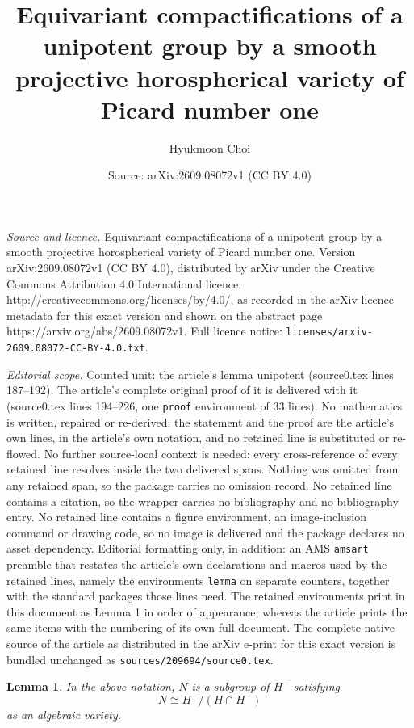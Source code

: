 \documentclass[10pt,a4paper]{amsart}
\title{Equivariant compactifications of a unipotent group by a smooth projective horospherical variety of Picard number one}
\author{Hyukmoon Choi}
\date{Source: arXiv:2609.08072v1 (CC BY 4.0)}
\newtheorem{lemma}{Lemma}
\begin{document}
\maketitle

\noindent\emph{Source and licence.} Equivariant compactifications of a unipotent group by a smooth projective horospherical variety of Picard number one. Version arXiv:2609.08072v1 (CC BY 4.0), distributed by arXiv under the Creative Commons Attribution 4.0 International licence, http://creativecommons.org/licenses/by/4.0/, as recorded in the arXiv licence metadata for this exact version and shown on the abstract page https://arxiv.org/abs/2609.08072v1. Full licence notice: \texttt{licenses/arxiv-2609.08072-CC-BY-4.0.txt}.\par\smallskip

\noindent\textit{Editorial scope.} Counted unit: the article's lemma unipotent (source0.tex lines 187--192). The article's complete original proof of it is delivered with it (source0.tex lines 194--226, one \texttt{proof} environment of 33 lines). No mathematics is written, repaired or re-derived: the statement and the proof are the article's own lines, in the article's own notation, and no retained line is substituted or re-flowed.  No further source-local context is needed: every cross-reference of every retained line resolves inside the two delivered spans.  Nothing was omitted from any retained span, so the package carries no omission record.  No retained line contains a citation, so the wrapper carries no bibliography and no bibliography entry.  No retained line contains a figure environment, an image-inclusion command or drawing code, so no image is delivered and the package declares no asset dependency.  Editorial formatting only, in addition: an AMS \texttt{amsart} preamble that restates the article's own declarations and macros used by the retained lines, namely the environments \texttt{lemma} on separate counters, together with the standard packages those lines need.  The retained environments print in this document as Lemma 1 in order of appearance, whereas the article prints the same items with the numbering of its own full document.  The complete native source of the article as distributed in the arXiv e-print for this exact version is bundled unchanged as \texttt{sources/209694/source0.tex}.
\begin{lemma}
\label{unipotent}
In the above notation, $N$ is a subgroup of $H^-$ satisfying
\[N \cong H^- /(H \cap H^-)\]
as an algebraic variety. 
\end{lemma}
\end{document}
